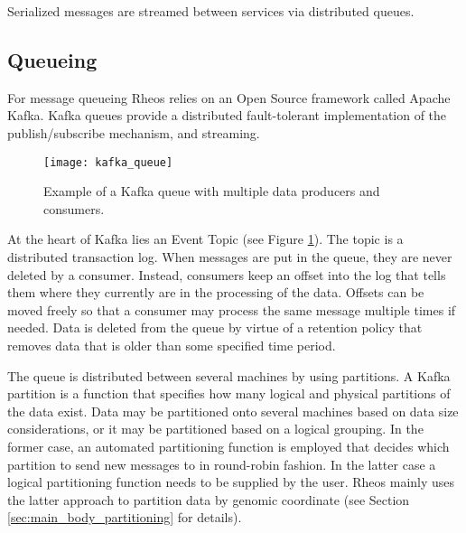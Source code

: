 Serialized messages are streamed between services via distributed queues.

\newpage
\subsection{Queueing}

For message queueing Rheos relies on an Open Source framework called Apache Kafka\autocite{kreps2011kafka}. Kafka queues provide a distributed fault-tolerant implementation of the publish/subscribe mechanism, and streaming. 

\begin{figure}[H]
    \texttt{[image: kafka\_queue]}
    \centering
    \caption {Example of a Kafka queue with multiple data producers and consumers.}
    \label{fig:kafka_queue}
\end{figure}

At the heart of Kafka lies an Event Topic (see Figure \ref{fig:kafka_queue}). The topic is a distributed transaction log. When messages are put in the queue, they are never deleted by a consumer. Instead, consumers keep an offset into the log that tells them where they currently are in the processing of the data. Offsets can be moved freely so that a consumer may process the same message multiple times if needed. Data is deleted from the queue by virtue of a retention policy that removes data that is older than some specified time period. 

The queue is distributed between several machines by using partitions. A Kafka partition is a function that specifies how many logical and physical partitions of the data exist. Data may be partitioned onto several machines based on data size considerations, or it may be partitioned based on a logical grouping. In the former case, an automated partitioning function is employed that decides which partition to send new messages to in round-robin fashion. In the latter case a logical partitioning function needs to be supplied by the user. Rheos mainly uses the latter approach to partition data by genomic coordinate (see Section \ref{sec:main_body_partitioning} for details).

